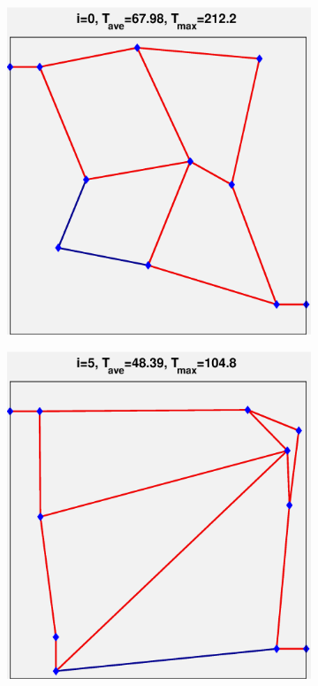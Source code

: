 \documentclass[11pt,letterpaper]{article}
\begin{document}
\begin{figure}[!h]
\centering
\begin{subfigure}{0.2\textwidth}
\includegraphics[width=\linewidth]{parallel2x2_channel_0.eps}
\caption{}
\end{subfigure}
\begin{subfigure}{0.2\textwidth}
\includegraphics[width=\linewidth]{parallel2x2_channel_5.eps}

\end{subfigure}
\end{figure}
\end{document}
